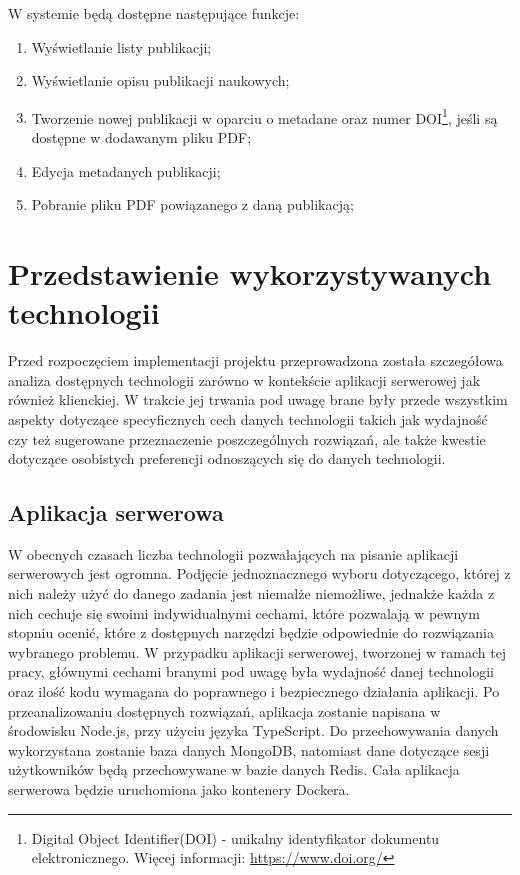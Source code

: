 \documentclass[a4paper,12pt,twoside,openany]{report}
\begin{document}
W systemie będą dostępne następujące funkcje:		
\begin{enumerate}
	\item Wyświetlanie listy publikacji;
	\item Wyświetlanie opisu publikacji naukowych;
	\item Tworzenie nowej publikacji w oparciu o metadane oraz numer DOI\footnote{Digital Object Identifier(DOI) - unikalny identyfikator dokumentu elektronicznego. Więcej informacji: \url{https://www.doi.org/} }, jeśli są dostępne w dodawanym pliku PDF;
	\item Edycja metadanych publikacji;
	\item Pobranie pliku PDF powiązanego z daną publikacją;
\end{enumerate}
\chapter{Przedstawienie wykorzystywanych technologii}
Przed rozpoczęciem implementacji projektu przeprowadzona została szczegółowa analiza dostępnych technologii zarówno w kontekście aplikacji serwerowej jak również klienckiej. W trakcie jej trwania pod uwagę brane były przede wszystkim aspekty dotyczące specyficznych cech danych technologii takich jak wydajność czy też sugerowane przeznaczenie poszczególnych rozwiązań, ale także kwestie dotyczące osobistych preferencji odnoszących się do danych technologii. \cite{LOKI2}
\section{Aplikacja serwerowa}
W obecnych czasach liczba technologii pozwalających na pisanie aplikacji serwerowych jest ogromna. Podjęcie jednoznacznego wyboru dotyczącego, której z nich należy użyć do danego zadania jest niemalże niemożliwe, jednakże każda z nich cechuje się swoimi indywidualnymi cechami, które pozwalają w pewnym stopniu ocenić, które z dostępnych narzędzi będzie odpowiednie do rozwiązania wybranego problemu. W przypadku aplikacji serwerowej, tworzonej w ramach tej pracy, głównymi cechami branymi pod uwagę była wydajność danej technologii oraz ilość kodu wymagana do poprawnego i bezpiecznego działania aplikacji. Po przeanalizowaniu dostępnych rozwiązań, aplikacja zostanie napisana w środowisku Node.js, przy użyciu języka TypeScript. Do przechowywania danych wykorzystana zostanie baza danych MongoDB, natomiast dane dotyczące sesji użytkowników będą przechowywane w bazie danych Redis. Cała aplikacja serwerowa będzie uruchomiona jako kontenery Dockera.
\end{document}
